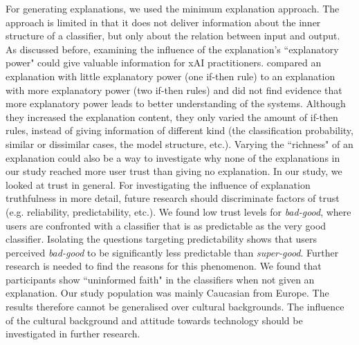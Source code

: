 For generating explanations, we used the minimum explanation approach. The approach is limited in that it does not deliver information about the inner structure of a classifier, but only about the relation between input and output. As discussed before, examining the influence of the explanation's ``explanatory power" could give valuable information for xAI practitioners. \cite{ribeiro2018anchors} compared an explanation with little explanatory power (one if-then rule) to an explanation with more explanatory power (two if-then rules) and did not find evidence that more explanatory power leads to better understanding of the systems. Although they increased the explanation content, they only varied the amount of if-then rules, instead of giving information of different kind (the classification probability, similar or dissimilar cases, the model structure, etc.). Varying the ``richness" of an explanation could also be a way to investigate why none of the explanations in our study reached more user trust than giving no explanation.\newline
In our study, we looked at trust in general. For investigating the influence of explanation truthfulness in more detail, future research should discriminate factors of trust (e.g. reliability, predictability, etc.). We found low trust levels for \textit{bad-good}, where users are confronted with a classifier that is as predictable as the very good classifier. Isolating the questions targeting predictability shows that users perceived \textit{bad-good} to be significantly less predictable than \textit{super-good}. Further research is needed to find the reasons for this phenomenon.\newline
We found that participants show ``uninformed faith" in the classifiers when not given an explanation. Our study population was mainly Caucasian from Europe. The results therefore cannot be generalised over cultural backgrounds. The influence of the cultural background and attitude towards technology should be investigated in further research.
